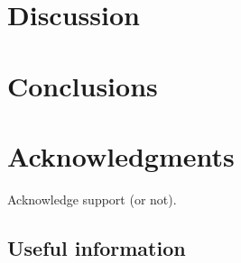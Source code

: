 \documentclass[twocolumn,apj,numberedappendix,appendixfloats]{openjournal}
\begin{document}
\clearpage

\section{Discussion} \label{sec:discussion}

\clearpage

\section{Conclusions} \label{sec:conclusions}

\clearpage

\section*{Acknowledgments}

Acknowledge support (or not).




\begin{appendix}

\section{Useful information}



\end{appendix}
\end{document}
